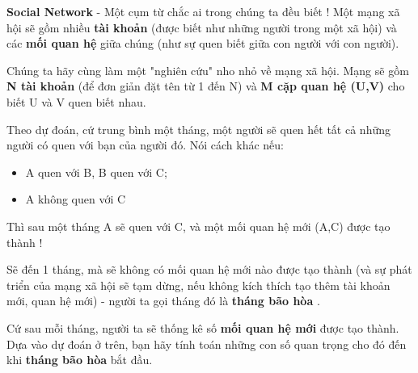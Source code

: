 \textbf{    Social Network   }   - Một cụm từ chắc ai trong chúng ta đều biết ! Một mạng xã hội sẽ gồm nhiều   \textbf{     tài khoản}   (được biết như những người trong một xã hội) và các   \textbf{     mối quan hệ}   giữa chúng (như sự quen biết giữa con người với con người).  

   Chúng ta hãy cùng làm một "nghiên cứu" nho nhỏ về mạng xã hội. Mạng sẽ gồm   \textbf{     N    tài khoản   }   (để đơn giản đặt tên từ 1 đến N) và   \textbf{     M    cặp quan hệ    \textbf{     (U,V)    }}   cho biết U và V quen biết nhau.  

   Theo dự đoán, cứ trung bình một tháng, một người sẽ quen hết tất cả những người có quen với bạn của người đó. Nói cách khác nếu:  
\begin{itemize}
	\item     A quen với B, B quen với C;   
	\item     A không quen với C   
\end{itemize}

   Thì sau một tháng A sẽ quen với C, và một mối quan hệ mới (A,C) được tạo thành !  

   Sẽ đến 1 tháng, mà sẽ không có mối quan hệ mới nào được tạo thành (và sự phát triển của mạng xã hội sẽ tạm dừng, nếu không kích thích tạo thêm tài khoản mới, quan hệ mới) - người ta gọi tháng đó là   \textbf{     tháng bão hòa}   .  

   Cứ sau mỗi tháng, người ta sẽ thống kê số   \textbf{     mối quan hệ mới}   được tạo thành. Dựa vào dự đoán ở trên, bạn hãy tính toán những con số quan trọng cho đó đến khi   \textbf{     tháng bão hòa}   bắt đầu.